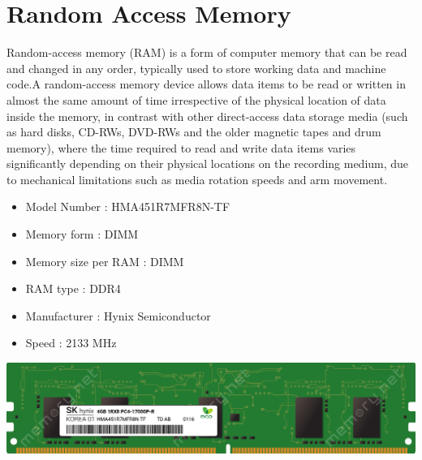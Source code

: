 \documentclass{article}
\begin{document}
\section{Random Access Memory}
Random-access memory (RAM) is a form of computer memory that can be read and changed in any order, typically used to store working data and machine code.A random-access memory device allows data items to be read or written in almost the same amount of time irrespective of the physical location of data inside the memory, in contrast with other direct-access data storage media (such as hard disks, CD-RWs, DVD-RWs and the older magnetic tapes and drum memory), where the time required to read and write data items varies significantly depending on their physical locations on the recording medium, due to mechanical limitations such as media rotation speeds and arm movement.
\begin{itemize}
  \item Model Number        : HMA451R7MFR8N-TF
  \item Memory form         : DIMM
  \item Memory size per RAM : DIMM
  \item RAM type            : DDR4
  \item Manufacturer        : Hynix Semiconductor 
  \item Speed               : 2133 MHz
\end{itemize}
\href{https://www.datasheets360.com/pdf/4058231500629532296}{\includegraphics[width=\textwidth]{RAM.png}}
\end{document}
